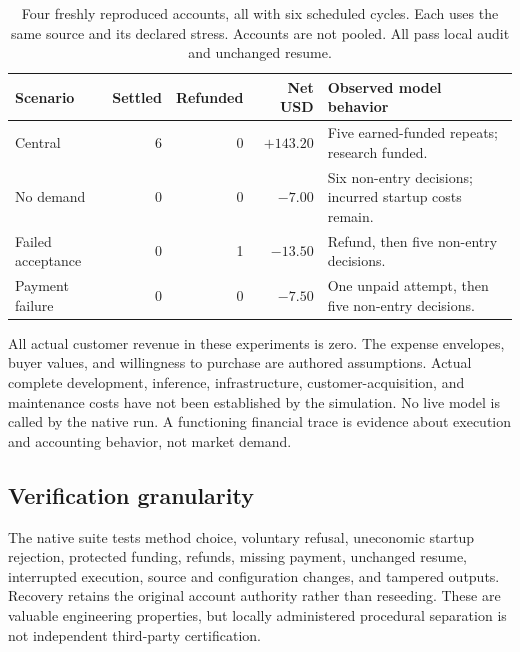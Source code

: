 \documentclass[11pt,letterpaper]{article}
\theoremstyle{remark}\newtheorem{remark}{Remark}[section]
\begin{document}
\begin{table}[H]
\caption{Four freshly reproduced accounts, all with six scheduled cycles. Each uses the same source and its declared stress. Accounts are not pooled. All pass local audit and unchanged resume.}\label{tab:native}
\small
\begin{tabularx}{\linewidth}{Y r r r P{3.4cm}}
\toprule
\textbf{Scenario}&\textbf{Settled}&\textbf{Refunded}&\textbf{Net USD}&\textbf{Observed model behavior}\\
\midrule
Central & 6 & 0 & $+143.20$ & Five earned-funded repeats; research funded.\\
No demand & 0 & 0 & $-7.00$ & Six non-entry decisions; incurred startup costs remain.\\
Failed acceptance & 0 & 1 & $-13.50$ & Refund, then five non-entry decisions.\\
Payment failure & 0 & 0 & $-7.50$ & One unpaid attempt, then five non-entry decisions.\\
\bottomrule
\end{tabularx}
\end{table}

All actual customer revenue in these experiments is zero. The expense envelopes, buyer values, and willingness to purchase are authored assumptions. Actual complete development, inference, infrastructure, customer-acquisition, and maintenance costs have not been established by the simulation. No live model is called by the native run. A functioning financial trace is evidence about execution and accounting behavior, not market demand.

\subsection{Verification granularity}
The native suite tests method choice, voluntary refusal, uneconomic startup rejection, protected funding, refunds, missing payment, unchanged resume, interrupted execution, source and configuration changes, and tampered outputs. Recovery retains the original account authority rather than reseeding. These are valuable engineering properties, but locally administered procedural separation is not independent third-party certification.
\end{document}
